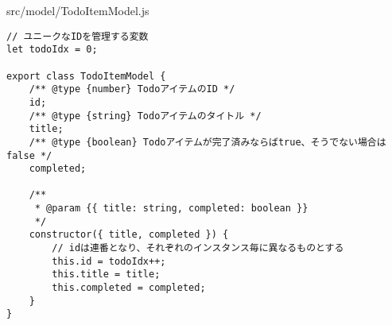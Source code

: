 \begin{listtitle}
src/model/TodoItemModel.js
\end{listtitle}
\begin{lstlisting}
// ユニークなIDを管理する変数
let todoIdx = 0;

export class TodoItemModel {
    /** @type {number} TodoアイテムのID */
    id;
    /** @type {string} Todoアイテムのタイトル */
    title;
    /** @type {boolean} Todoアイテムが完了済みならばtrue、そうでない場合はfalse */
    completed;

    /**
     * @param {{ title: string, completed: boolean }}
     */
    constructor({ title, completed }) {
        // idは連番となり、それぞれのインスタンス毎に異なるものとする
        this.id = todoIdx++;
        this.title = title;
        this.completed = completed;
    }
}
\end{lstlisting}
\listend
